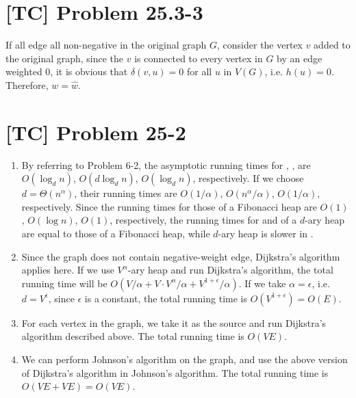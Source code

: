 \documentclass[a4paper,11pt,twocolumn]{article}
\begin{document}
  \section{[TC] Problem 25.3-3}
  If all edge all non-negative in the original graph $G$, consider the vertex $v$ added to the original graph, since the $v$ is connected to every vertex in $G$ by an edge weighted 0, it is obvious that $\delta(v, u) = 0$ for all $u$ in $V(G)$, i.e. $h(u) = 0$. Therefore, $w = \hat{w}$.

  \section{[TC] Problem 25-2}
  \begin{enumerate}
  	\item By referring to Problem 6-2, the asymptotic running times for , ,  are $O(\log_d n)$, $O(d \log_d n)$, $O(\log_d n )$, respectively. If we choose $d = \Theta(n^{\alpha})$, their running times are $O(1/\alpha)$, $O(n^{\alpha}/\alpha)$, $O(1/\alpha)$, respectively. Since the running times for those of a Fibonacci heap are $O(1)$, $O(\log n)$, $O(1)$, respectively, the running times for  and  of a $d$-ary heap are equal to those of a Fibonacci heap, while $d$-ary heap is slower in .
    \item Since the graph does not contain negative-weight edge, Dijkstra's algorithm applies here. If we use $V^{\alpha}$-ary heap and run Dijkstra's algorithm, the total running time will be $O(V / \alpha + V \cdot V^{\alpha}/\alpha + V^{1 + \epsilon}/\alpha)$. If we take $\alpha = \epsilon$, i.e. $d = V^{\epsilon}$, since $\epsilon$ is a constant, the total running time is $O(V^{1+\epsilon}) = O(E)$.
    \item For each vertex in the graph, we take it as the source and run Dijkstra's algorithm described above. The total running time is $O(VE)$.
    \item We can perform Johnson's algorithm on the graph, and use the above version of Dijkstra's algorithm in Johnson's algorithm. The total running time is $O(VE + VE) = O(VE)$.
  \end{enumerate}
\end{document}
